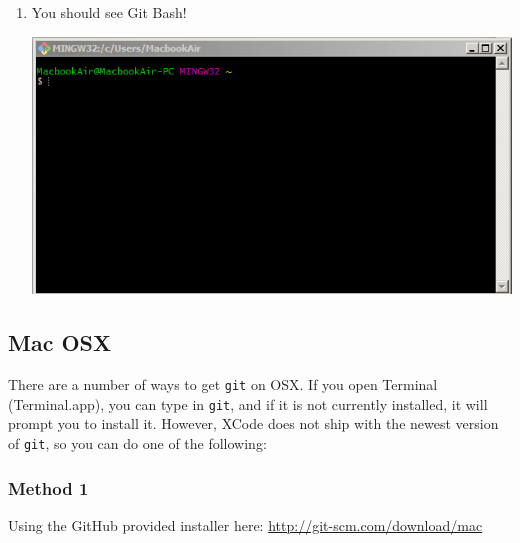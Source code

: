 \documentclass[11pt,fleqn]{article}
\theoremstyle{definition}
\begin{document}
\begin{enumerate}[Step 1.]
\item You should see Git Bash!
\begin{center}
\includegraphics[scale=0.6]{gitwininstall13.png}
\end{center}
\end{enumerate}

\newpage
\subsection{Mac OSX}
There are a number of ways to get \texttt{git} on OSX. If you open Terminal
(Terminal.app), you can type in \texttt{git}, and if it is not currently
installed, it will prompt you to install it. However, XCode does not ship with
the newest version of \texttt{git}, so you can do one of the following:

\subsubsection{Method 1}
Using the GitHub provided installer here: \url{http://git-scm.com/download/mac}
\end{document}
